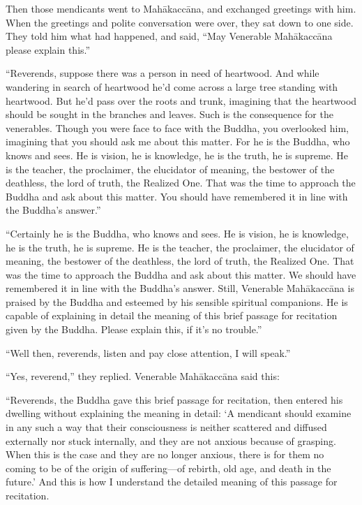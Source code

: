 \documentclass[12pt,openany]{book}%
\begin{document}
Then those mendicants went to \textsanskrit{Mahākaccāna}, and exchanged greetings with him. When the greetings and polite conversation were over, they sat down to one side. They told him what had happened, and said, “May Venerable \textsanskrit{Mahākaccāna} please explain this.” 

“Reverends, suppose there was a person in need of heartwood. And while wandering in search of heartwood he’d come across a large tree standing with heartwood. But he’d pass over the roots and trunk, imagining that the heartwood should be sought in the branches and leaves. Such is the consequence for the venerables. Though you were face to face with the Buddha, you overlooked him, imagining that you should ask me about this matter. For he is the Buddha, who knows and sees. He is vision, he is knowledge, he is the truth, he is supreme. He is the teacher, the proclaimer, the elucidator of meaning, the bestower of the deathless, the lord of truth, the Realized One. That was the time to approach the Buddha and ask about this matter. You should have remembered it in line with the Buddha’s answer.” 

“Certainly he is the Buddha, who knows and sees. He is vision, he is knowledge, he is the truth, he is supreme. He is the teacher, the proclaimer, the elucidator of meaning, the bestower of the deathless, the lord of truth, the Realized One. That was the time to approach the Buddha and ask about this matter. We should have remembered it in line with the Buddha’s answer. Still, Venerable \textsanskrit{Mahākaccāna} is praised by the Buddha and esteemed by his sensible spiritual companions. He is capable of explaining in detail the meaning of this brief passage for recitation given by the Buddha. Please explain this, if it’s no trouble.” 

“Well then, reverends, listen and pay close attention, I will speak.” 

“Yes, reverend,” they replied. Venerable \textsanskrit{Mahākaccāna} said this: 

“Reverends, the Buddha gave this brief passage for recitation, then entered his dwelling without explaining the meaning in detail: ‘A mendicant should examine in any such a way that their consciousness is neither scattered and diffused externally nor stuck internally, and they are not anxious because of grasping. When this is the case and they are no longer anxious, there is for them no coming to be of the origin of suffering—of rebirth, old age, and death in the future.’ And this is how I understand the detailed meaning of this passage for recitation. 
\end{document}
